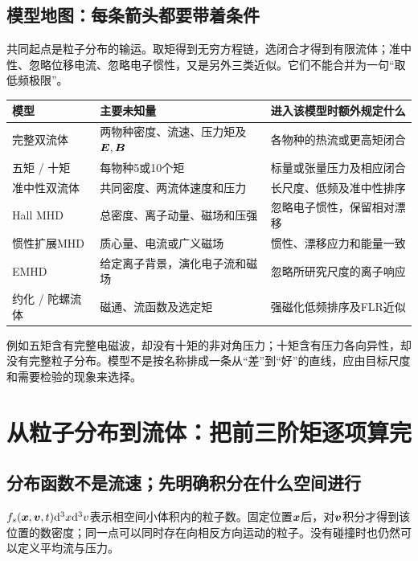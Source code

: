 \documentclass[UTF8,a4paper,11pt,openany,fontset=fandol]{ctexbook}
\begin{document}
\subsection{模型地图：每条箭头都要带着条件}
共同起点是粒子分布的输运。取矩得到无穷方程链，选闭合才得到有限流体；准中性、忽略位移电流、忽略电子惯性，又是另外三类近似。它们不能合并为一句“取低频极限”。
\begin{longtable}{P{30mm}P{59mm}P{60mm}}
\toprule 模型 & 主要未知量 & 进入该模型时额外规定什么\\\midrule
完整双流体 & 两物种密度、流速、压力矩及$\bm{E},\bm{B}$ & 各物种的热流或更高矩闭合\\
五矩 / 十矩 & 每物种5或10个矩 & 标量或张量压力及相应闭合\\
准中性双流体 & 共同密度、两流体速度和压力 & 长尺度、低频及准中性排序\\
Hall MHD & 总密度、离子动量、磁场和压强 & 忽略电子惯性，保留相对漂移\\
惯性扩展MHD & 质心量、电流或广义磁场 & 惯性、漂移应力和能量一致\\
EMHD & 给定离子背景，演化电子流和磁场 & 忽略所研究尺度的离子响应\\
约化 / 陀螺流体 & 磁通、流函数及选定矩 & 强磁化低频排序及FLR近似\\\bottomrule
\end{longtable}
例如五矩含有完整电磁波，却没有十矩的非对角压力；十矩含有压力各向异性，却没有完整粒子分布。模型不是按名称排成一条从“差”到“好”的直线，应由目标尺度和需要检验的现象来选择。\citep{Hakim2008,Wang2015}

\section{从粒子分布到流体：把前三阶矩逐项算完}
\label{sec:tutorial-moments}
\subsection{分布函数不是流速；先明确积分在什么空间进行}
$f_s(\bm{x},\bm{v},t)\mathrm d^3x\mathrm d^3v$表示相空间小体积内的粒子数。固定位置$\bm{x}$后，对$\bm{v}$积分才得到该位置的数密度；同一点可以同时存在向相反方向运动的粒子。没有碰撞时也仍然可以定义平均流与压力。
\end{document}

